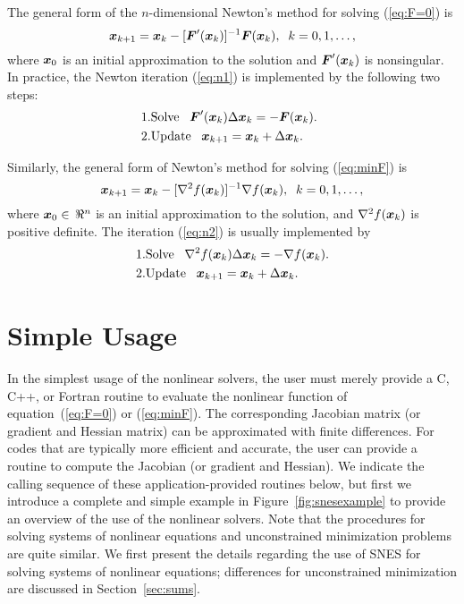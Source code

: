 The general form of the $n$-dimensional Newton's method for solving
(\ref{eq:F=0}) is
\begin{equation}
     \mbox{\boldmath \(x\)}_{k+1} = \mbox{\boldmath \(x\)}_k - [ \mbox{\boldmath \(F\)}'(\mbox{\boldmath \(x\)}_k)]^{-1} \mbox{\boldmath \(F\)}(\mbox{\boldmath \(x\)}_k), \;\; k=0,1, \ldots, 
\label{eq:n1}
\end{equation}
where $\mbox{\boldmath \(x\)}_0$ is an initial approximation to the solution and   
$\mbox{\boldmath \(F\)}'(\mbox{\boldmath \(x\)}_k)$ is nonsingular.  
In practice, the Newton iteration (\ref{eq:n1}) is implemented by
the following two steps:
\begin{eqnarray}
  1. & {\rm Solve\;\;\;} \mbox{\boldmath \(F\)}'(\mbox{\boldmath \(x\)}_k) \Delta \mbox{\boldmath \(x\)}_k = -\mbox{\boldmath \(F\)}(\mbox{\boldmath \(x\)}_k).\\
  2. & {\rm Update\;\;\;} \mbox{\boldmath \(x\)}_{k+1} = \mbox{\boldmath \(x\)}_k + \Delta \mbox{\boldmath \(x\)}_k. \hspace{.225in}
\end{eqnarray}

Similarly, the general form of Newton's method for solving (\ref{eq:minF}) is
\begin{equation}
    \mbox{\boldmath \(x\)}_{k+1} = \mbox{\boldmath \(x\)}_k - [ \nabla^2 f(\mbox{\boldmath \(x\)}_k)]^{-1} \nabla f(\mbox{\boldmath \(x\)}_k), \;\;
          k=0,1, \ldots,
\label{eq:n2}
\end{equation}
where $\mbox{\boldmath \(x\)}_0 \in \, \Re^n$ is an initial approximation
to the solution, and $\nabla^2 f(\mbox{\boldmath \(x\)}_k)$ is positive definite.
The iteration (\ref{eq:n2}) is usually implemented by
\begin{eqnarray}
  1. & {\rm Solve\;\;\;} \nabla^2 f(\mbox{\boldmath \(x\)}_k) \Delta \mbox{\boldmath \(x\)}_k = -\nabla f(\mbox{\boldmath \(x\)}_k).\\
  2. & {\rm Update\;\;\;} \mbox{\boldmath \(x\)}_{k+1} = \mbox{\boldmath \(x\)}_k + \Delta \mbox{\boldmath \(x\)}_k. \hspace{.325in}
\end{eqnarray}

\section{Simple Usage}

In the simplest usage of the nonlinear solvers, the user must merely 
provide a C, C++, or Fortran routine to evaluate the nonlinear function 
of equation~(\ref{eq:F=0}) or (\ref{eq:minF}).
The corresponding Jacobian  matrix 
(or gradient  and Hessian  matrix) 
can be approximated with finite differences.
For codes that are typically more efficient and accurate, the
user can provide a routine to compute the Jacobian (or gradient 
and Hessian).
We indicate the calling sequence of these application-provided 
routines below, but first we introduce a complete and simple example in
Figure~\ref{fig:snesexample} to provide an overview of the use of
the nonlinear solvers.  Note that the procedures for solving systems
of nonlinear equations and unconstrained minimization problems
are quite similar.  We first present the details 
regarding the use of SNES for solving systems of nonlinear equations;
differences for unconstrained minimization are discussed in 
Section~\ref{sec:sums}.

